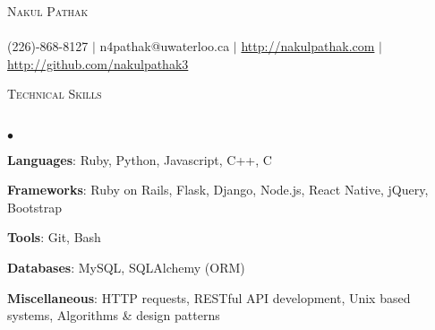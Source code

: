 \documentclass[10pt]{article}
\newcommand{\lineunder}{\vspace*{-8pt} \\ \hspace*{-18pt} \hrulefill \\}
\newcommand{\header}[1]{{\hspace*{-15pt}\vspace*{6pt} \textsc{#1}} \vspace*{-6pt} \lineunder}
\newenvironment{achievements}{\begin{list}{$\bullet$}{\topsep 0pt \itemsep -1.5pt \leftmargin 5pt}}{\vspace*{4pt}\end{list}}
\begin{document}
\small
\smallskip
\vspace*{-45pt}

\begin{center}
	{\Huge \scshape {Nakul Pathak}} \\
\hspace*{-18pt} \hrulefill \\
\vspace{2pt}
\hspace*{-18pt} (226)-868-8127 $|$ n4pathak@uwaterloo.ca $|$ \url{http://nakulpathak.com} $|$  \url{http://github.com/nakulpathak3}
\vspace{-5pt}
\end{center}

\vspace{7pt}

\header{\normalsize Technical Skills}
\begin{achievements}
\item \textbf{Languages}: Ruby, Python, Javascript, C++, C
\item \textbf{Frameworks}: Ruby on Rails, Flask, Django, Node.js, React Native, jQuery, Bootstrap
\item \textbf{Tools}: Git, Bash
\item \textbf{Databases}: MySQL,  SQLAlchemy (ORM)
\item \textbf{Miscellaneous}: HTTP requests, RESTful API development, Unix based systems, Algorithms \& design patterns
\end{achievements}

\vspace{6pt}
\end{document}
